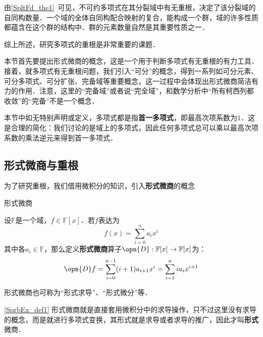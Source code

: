 




由\autoref{SpltFd_the1}~可见，不可约多项式在其分裂域中有无重根，决定了该分裂域的自同构数量．一个域的全体自同构配合映射的复合，能构成一个群，域的许多性质都蕴含在这个群的结构中．群的元素数量自然是其重要性质之一．

综上所述，研究多项式的重根是非常重要的课题．

本节首先要提出形式微商的概念，这是一个用于判断多项式有无重根的有力工具．接着，就多项式有无重根问题，我们引入“可分”的概念，得到一系列如可分元素、可分多项式、可分扩张、完备域等重要概念，这一过程中会体现出形式微商简洁有力的作用．注意，这里的“完备域”或者说“完全域”，和数学分析中“所有柯西列都收敛”的“完备”不是一个概念．

本节中如无特别声明或定义，多项式都是指\textbf{首一多项式}，即最高次项系数为$1$．这是合理的简化：我们讨论的是域上的多项式，因此任何多项式总可以乘以最高次项系数的乘法逆元来得到首一多项式．

\subsection{形式微商与重根}

为了研究重根，我们借用微积分的知识，引入\textbf{形式微商}的概念

\begin{definition}{形式微商}\label{SprbEx_def1}

设$\mathbb{F}$是一个域，$f\in\mathbb{F}[x]$．若$f$表达为
\begin{equation}
f(x) = \sum_{i=0}^n a_ix^i
\end{equation}
其中各$a_i\in\mathbb{F}$，那么定义\textbf{形式微商}算子$\opn{D}:\mathbb{F}[x]\to\mathbb{F}[x]$为：
\begin{equation}
\opn{D}f = \sum_{i=0}^{n-1} (i+1)a_{i+1}x^i = \sum_{i=1}^{n} ia_{i}x^{i+1}
\end{equation}

形式微商也可称为“形式求导”、“形式微分”等．

\end{definition}

\autoref{SprbEx_def1} 形式微商就是直接套用微积分中的求导操作，只不过这里没有求导的概念，而是就进行多项式变换，其形式就是求导或者求导的推广，因此才叫\textbf{形式}微商．

